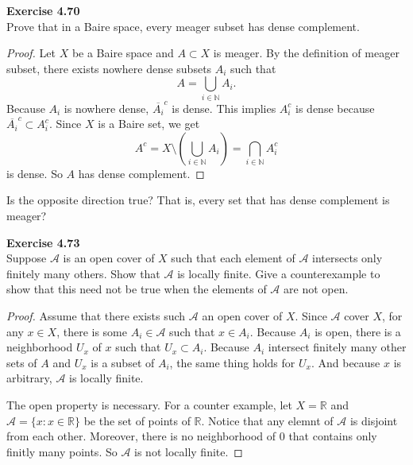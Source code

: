 \documentclass[12pt, a4paper]{article}
\theoremstyle{plain}
\newcommand{\N}{\mathbb{N}}
\newcommand{\A}{\mathscr{A}}
\newcommand{\R}{\mathbb{R}}
\newenvironment{exercise}[2][Exercise]
    { \begin{mdframed}[backgroundcolor=gray!20] \textbf{#1 #2} \\}
    {  \end{mdframed}}
\begin{document}
\begin{exercise}{4.70}
    Prove that in a Baire space, every meager subset has dense complement.
\end{exercise}
    \begin{proof}
        Let $X$ be a Baire space and $A\subset X$ is meager. By the definition of meager subset, there exists nowhere dense subsets $A_i$ such that
        \[
        A = \bigcup_{i\in \N}A_i.
        \]
        Because $A_i$ is nowhere dense, $\overline{A_i}^c$ is dense. This implies $A_i^c$ is dense because $\overline{A_i}^c\subset A_i^c$. Since $X$ is a Baire set, we get
        \[
        A^c = X\setminus (\bigcup_{i\in \N}A_i) = \bigcap_{i\in \N} A_i^c
        \]
        is dense. So $A$ has dense complement.
    \end{proof}

Is the opposite direction true? That is, every set that has dense complement is meager?

\begin{exercise}{4.73}
    Suppose $\A$ is an open cover of $X$ such that each element of $\A$ intersects only finitely many others. Show that $\A$ is locally finite. Give a counterexample to show that this need not be true when the elements of $\A$ are not open.
\end{exercise}
    \begin{proof}
        Assume that there exists such $\A$ an open cover of $X$. Since $\A$ cover $X$, for any $x\in X$, there is some $A_i\in \A$ such that $x\in A_i$. Because $A_i$ is open, there is a neighborhood $U_x$ of $x$ such that $U_x\subset A_i$. Because $A_i$ intersect finitely many other sets of $A$ and $U_x$ is a subset of $A_i$, the same thing holds for $U_x$. And because $x$ is arbitrary, $\A$ is locally finite.

        The open property is necessary. For a counter example, let $X=\R$ and $\A=\{x:x\in \R\}$ be the set of points of $\R$. Notice that any elemnt of $\A$ is disjoint from each other. Moreover, there is no neighborhood of $0$ that contains only finitly many points. So $\A$ is not locally finite.
    \end{proof}

\pagebreak
\end{document}
